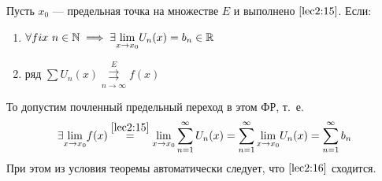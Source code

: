 \documentclass[../../main.tex]{subfiles}
\begin{document}
\begin{thm}
Пусть $x_0$ --- предельная точка на множестве $E$ и выполнено 
$\eqref{lec2:15}$. Если: 
\begin{enumerate}
	\item $\forall fix \ n \in \mathbb{N} \implies
\exists \underset{x \to x_0}{\lim} U_n(x) = b_n \in \mathbb{R}$
	\item ряд $\sum U_n(x) \overset{E}
	{\underset{n \to \infty}\rightrightarrows} f(x)$
\end{enumerate}
То допустим почленный предельный переход в этом ФР, т.~е.
\begin{equation}
\label{lec2:16}
\exists \underset{x \to x_0}{\lim} f(x) \overset{\eqref{lec2:15}}{=}
\underset{x \to x_0}{\lim} \sum\limits_{n = 1}^{\infty} U_n(x) =
\sum\limits_{n = 1}^{\infty} \underset{x \to x_0}{\lim} U_n(x) =
\sum\limits_{n = 1}^{\infty} b_n
\end{equation}	
При этом из условия теоремы автоматически следует, 
что $\eqref{lec2:16}$ сходится.
\end{thm}	
\end{document}
